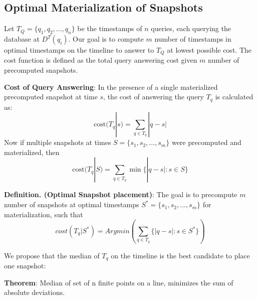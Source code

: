 \subsection{Optimal Materialization of Snapshots}
Let $T_Q = \{q_1, q_2, \dots, q_n\}$ be the timestamps of $n$ queries, each 
querying the database at $D^T(q_i)$. Our goal is to compute $m$ number of timestamps in optimal timestamps on the timeline to answer to $T_Q$ at lowest possible cost. The cost function is defined as the total query answering cost given $m$ number of precomputed snapshots.

\textbf{Cost of Query Answering}: In the presence of a single materialized precomputed snapshot at time $s$, the cost of answering the query $T_q$ is calculated as:
$$\mathrm{cost}(T_q | s) = \sum_{q\in T_q} |q - s|$$
Now if multiple snapshots at times $S=\{s_1, s_2, \dots, s_m\}$ were precomputed and materialized, then 
$$\mathrm{cost}(T_q|S) = \sum_{q\in T_q} \min\{|q-s| : s\in S\}$$

\textbf{Definition. (Optimal Snapshot placement)}: The goal is to precompute $m$ number of snapshots at optimal timestamps $S^*=\{s_1, s_2, \dots, s_m\}$ for materialization, such that 
$$cost(T_q|S^*)= Arg min(\sum_{q\in T_q}\{|q - s|:s \in S^*\})$$

We propose that the median of $T_q$ on the timeline is the best candidate to place one snapshot:

\textbf{Theorem}: Median of set of n finite points on a line, minimizes the sum of absolute deviations.

